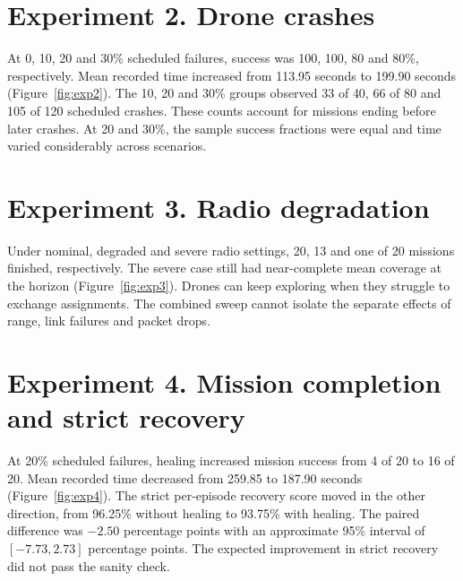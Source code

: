 \FloatBarrier

\section{Experiment 2. Drone crashes}
At 0, 10, 20 and 30\% scheduled failures, success was 100, 100, 80 and 80\%, respectively. Mean recorded time increased from 113.95 seconds to 199.90 seconds (Figure~\ref{fig:exp2}). The 10, 20 and 30\% groups observed 33 of 40, 66 of 80 and 105 of 120 scheduled crashes. These counts account for missions ending before later crashes. At 20 and 30\%, the sample success fractions were equal and time varied considerably across scenarios.

\FloatBarrier

\section{Experiment 3. Radio degradation}
Under nominal, degraded and severe radio settings, 20, 13 and one of 20 missions finished, respectively. The severe case still had near-complete mean coverage at the horizon (Figure~\ref{fig:exp3}). Drones can keep exploring when they struggle to exchange assignments. The combined sweep cannot isolate the separate effects of range, link failures and packet drops.

\FloatBarrier

\section{Experiment 4. Mission completion and strict recovery}
At 20\% scheduled failures, healing increased mission success from 4 of 20 to 16 of 20. Mean recorded time decreased from 259.85 to 187.90 seconds (Figure~\ref{fig:exp4}). The strict per-episode recovery score moved in the other direction, from 96.25\% without healing to 93.75\% with healing. The paired difference was $-2.50$ percentage points with an approximate 95\% interval of $[-7.73,2.73]$ percentage points. The expected improvement in strict recovery did not pass the sanity check.

